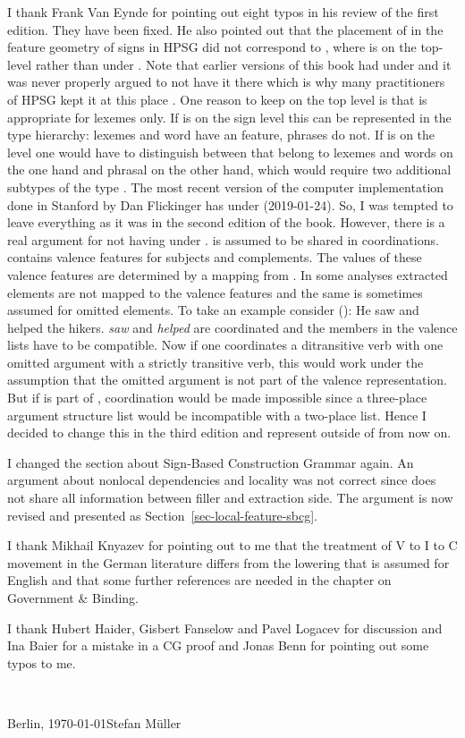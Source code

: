 I thank Frank Van Eynde for pointing out eight typos in his review of the first edition. They have
been fixed. He also pointed out that the placement of \argst in the feature geometry of signs in
HPSG did not correspond to , where \argst is on the top-level rather than under
\cat. Note that earlier versions of this book had \argst under \cat and it was never properly argued
to not have it there which is why many practitioners of HPSG kept it at this place
\citep{MuellerLFGphrasal}. One reason to keep \argst on the top level is that \argst is appropriate
for lexemes only. If \argst is on the sign level this can be represented in the type hierarchy:
lexemes and word have an \argst feature, phrases do not. If \argst is on the \cat level one would
have to distinguish between \catvs that belong to lexemes and words on the one hand and phrasal
\catvs on the other hand, which would require two additional subtypes of the type . 
The most recent version of the computer implementation done in Stanford by Dan Flickinger has \argst
under \local (2019-01-24). So, I was tempted to leave everything as it was in the second edition of
the book. However, there is a real argument for not having \argst under \cat. \cat is assumed to be
shared in coordinations. \cat contains valence features for subjects and complements. The values of
these valence features are determined by a mapping from \argst. In some analyses extracted elements
are not mapped to the valence features and the same is sometimes assumed for omitted elements. To
take an example consider ():
\ea
He saw and helped the hikers.
\z
\emph{saw} and \emph{helped} are coordinated and the members in the valence lists have to be
compatible. Now if one coordinates a ditransitive verb with one omitted argument with a strictly
transitive verb, this would work under the assumption that the omitted argument is not part of the
valence representation. But if \argst is part of \cat, coordination would be made impossible since a
three-place argument structure list would be incompatible with a two-place list. Hence I decided to
change this in the third edition and represent \argst outside of \cat from now on.

I changed the section about Sign-Based Construction Grammar again. An argument about nonlocal
dependencies and locality was not correct since \citet[]{Sag2012a} does not share all
information between filler and extraction side. The argument is now revised and presented as Section~\ref{sec-local-feature-sbcg}.

I thank Mikhail Knyazev for pointing out to me that the treatment of V to I to C movement in the
German literature differs from the lowering that is assumed for English and that some further
references are needed in the chapter on Government \& Binding. 

I thank Hubert Haider, Gisbert
Fanselow and Pavel Logacev for discussion and Ina Baier for a mistake in a CG proof and Jonas Benn for pointing out some typos to me.

~\medskip

\noindent
Berlin, \today\hfill Stefan Müller



